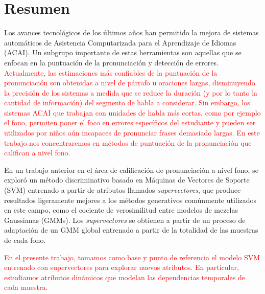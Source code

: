 \chapter*{Resumen}

Los avances tecnológicos de los últimos años han permitido la mejora de sistemas
automáticos de Asistencia Computarizada para el Aprendizaje de Idiomas (ACAI).
Un subgrupo importante de estas herramientas son aquellas que se enfocan en la
puntuación de la pronunciación y detección de errores.
\textcolor{red}{
Actualmente, las estimaciones más confiables de la puntuación de la pronunciación
son obtenidas a nivel de párrafo u oraciones largas, disminuyendo la precisión
de los sistemas a medida que se reduce la duración
(y por lo tanto la cantidad de información) del segmento de habla a considerar.
Sin embargo, los sistemas ACAI que trabajan con unidades de habla
más cortas, como por ejemplo el fono,
permiten poner el foco en errores específicos del estudiante y
pueden ser utilizados por niños aún incapaces de pronunciar frases
demasiado largas.
En este trabajo nos concentraremos en métodos de puntuación de la pronunciación
que califican a nivel fono.
}


En un trabajo anterior en el área de calificación de pronunciación a nivel fono,
se exploró
un método discriminativo basado en Máquinas de Vectores de Soporte (SVM) entrenado
a partir de atributos llamados \textit{supervectores},
que produce resultados ligeramente mejores a los métodos
generativos comúnmente utilizados en este campo, como el cociente de verosimilitud
entre modelos de mezclas Gaussianas (GMMs). Los \textit{supervectores} se obtienen a partir de
un proceso de adaptación de un GMM global entrenado a partir de la totalidad
de las muestras de cada fono.

\textcolor{red}{
En el presente trabajo, tomamos como
base y punto de referencia el modelo SVM entrenado con
supervectores para explorar nuevos atributos.
En particular, estudiamos atributos dinámicos que modelan las dependencias
temporales de cada muestra.}

